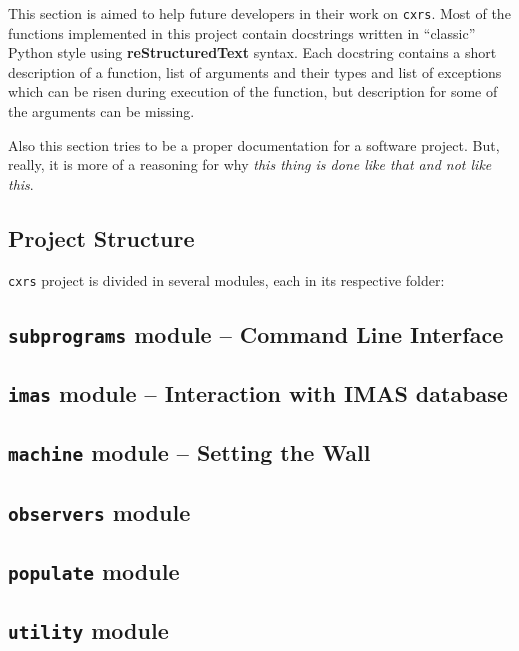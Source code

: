 \documentclass[../../main]{subfiles}
\begin{document}
This section is aimed to help future developers in their work on \texttt{cxrs}. Most of the functions implemented in this project contain docstrings written in \enquote{classic} Python style using \textbf{reStructuredText} syntax. Each docstring contains a short description of a function, list of arguments and their types and list of exceptions which can be risen during execution of the function, but description for some of the arguments can be missing.

Also this section tries to be a proper documentation for a software project. But, really, it is more of a reasoning for why \emph{this thing is done like that and not like this}.

\subsection{Project Structure}%
\label{sec:project_structure}

\texttt{cxrs} project is divided in several modules, each in its respective folder:


\subsection{\texttt{subprograms} module -- Command Line Interface}%
\label{sec:subprograms}%
%

\subsection{\texttt{imas} module -- Interaction with IMAS database}%
\label{sec:reading_from_imas}%
%

\subsection{\texttt{machine} module -- Setting the Wall}%
\label{sec:wall}%
%

\subsection{\texttt{observers} module}%
\label{sec:observers}%
%

\subsection{\texttt{populate} module}%
\label{sec:atomic}%
%

\subsection{\texttt{utility} module}%
\label{sec:utility}%
%
\end{document}

